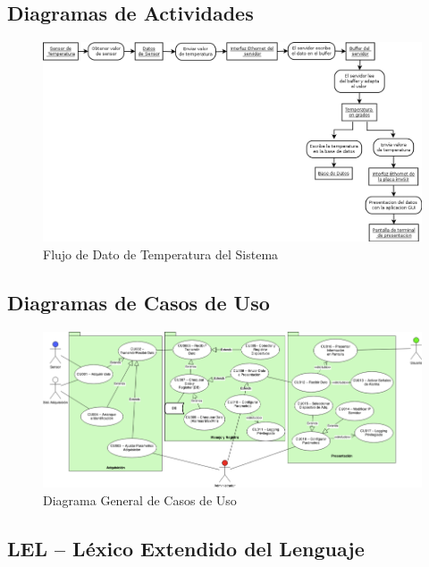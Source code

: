 \subsection{\textcolor[gray]{.2}{Diagramas de Actividades}}
\begin{figure}[h!]
 \begin{center}
  \includegraphics[width=1\textwidth,keepaspectratio=true]{img/diagactiv.png}
 \caption{Flujo de Dato de Temperatura del Sistema}
  \label{fig:esquema}
 \end{center}
\end{figure}


\subsection{\textcolor[gray]{.2}{Diagramas de Casos de Uso}}
\begin{figure}[h!]
 \begin{center}
  \includegraphics[width=1\textwidth,keepaspectratio=true]{img/usecases.png}
  \caption{Diagrama General de Casos de Uso}
  \label{fig:esquema}
 \end{center}
\end{figure}

\newpage
\subsection{\textcolor[gray]{.2}{LEL – Léxico Extendido del Lenguaje}}
	

